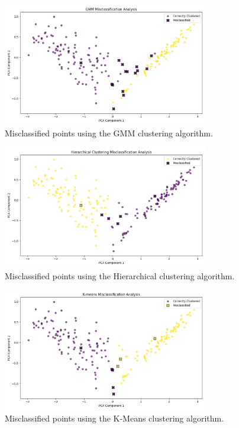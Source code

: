 \documentclass[a4paper,12pt]{report}
\begin{document}
\begin{figure}[H]
    \centering
    \includegraphics[width=0.8\textwidth]{images/clustering/gmm_misclassifications.png}
    \caption{Misclassified points using the GMM clustering algorithm.}
\end{figure}

\begin{figure}[H]
    \centering
    \includegraphics[width=0.8\textwidth]{images/clustering/hierarchical_misclassifications.png}
    \caption{Misclassified points using the Hierarchical clustering algorithm.}
\end{figure}

\begin{figure}[H]
    \centering
    \includegraphics[width=0.8\textwidth]{images/clustering/kmeans_misclassifications.png}
    \caption{Misclassified points using the K-Means clustering algorithm.}
\end{figure}
\end{document}

